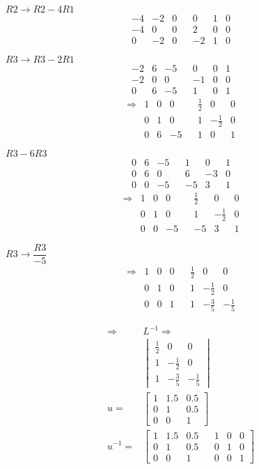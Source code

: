 \documentclass[a4paper,11pt]{article}
\begin{document}
\( R2 \rightarrow R2 - 4R1 \)
\[ \begin{array}{rrrrrrr}
-4 & -2 & 0 && 0 & 1 & 0 \\
-4 & 0 & 0 && 2 & 0 & 0 \\ \hline
0 & -2 & 0 && -2 & 1 & 0
\end{array} \]


\( R3 \rightarrow R3 - 2R1 \)
\[ \begin{array}{rrrrrrr}
-2 & 6 & -5 && 0 & 0 & 1 \\
-2 & 0 & 0 && -1 & 0 & 0 \\ \hline
0 & 6 & -5 && 1 & 0 & 1
\end{array} \]
\[\begin{array}{rrrrrrrr}
    \Rightarrow  &1 & 0 & 0 && \frac{1}{2} & 0 & 0 \\ [1mm]
    & 0 & 1 & 0 && 1 & -\frac{1}{2} & 0 \\ [1mm]
    & 0 & 6 & -5 && 1 & 0 & 1
\end{array}\]

\( R3 - 6R3 \)
\[ \begin{array}{rrrrrrr}
0 & 6 & -5 && 1 & 0 & 1 \\
0 & 6 & 0 && 6 & -3 & 0 \\ \hline
0 & 0 & -5 && -5 & 3 & 1
\end{array} \]
\[\begin{array}{rrrrrrrr}
    \Rightarrow  &1 & 0 & 0 && \frac{1}{2} & 0 & 0 \\ [1mm]
    & 0 & 1 & 0 && 1 & -\frac{1}{2} & 0 \\ [1mm]
    & 0 & 0 & -5 && -5 & 3 & 1
\end{array}\]

\( R3 \rightarrow \dfrac{R3}{-5} \)
\[\begin{array}{rlrrrrrr}
    \Rightarrow  & 1 & 0 & 0 && \frac{1}{2} & 0 & 0 \\ [2mm]
    & 0 & 1 & 0 && 1 & -\frac{1}{2} & 0 \\ [2mm]
    & 0 & 0 & 1 && 1 & -\frac{3}{5} & -\frac{1}{5} 
\end{array}\]

\[
\begin{array}{rl}
\Rightarrow & L^{-1} \Rightarrow \\
& \begin{vmatrix}
\frac{1}{2} & 0 & 0 \\
1 & -\frac{1}{2} & 0 \\
1 & -\frac{3}{5} & -\frac{1}{5} 
\end{vmatrix} \\ [8mm]
u =& 
\begin{bmatrix}
1 & 1.5 & 0.5 \\
0 & 1 & 0.5 \\
0 & 0 & 1
\end{bmatrix} \\ [8mm]
u^{-1} =& 
\begin{bmatrix}
1 & 1.5 & 0.5 && 1 & 0 & 0 \\
0 & 1 & 0.5 && 0 & 1 & 0 \\
0 & 0 & 1 && 0 & 0 & 1
\end{bmatrix}
\end{array}
\]
\end{document}
